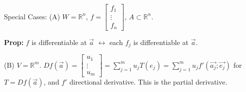\documentclass[10pt,letterpaper]{article}
\newcommand{\n}{\hfill\break}
\newcommand{\prop}[1]{\par\noindent\settowidth{\hangindent}{\textbf{Prop: }}\textbf{Prop: }#1\n}
\newcommand{\reals}{\mathbb{R}}
\newcommand{\R}{\reals}
\begin{document}
\par\noindent Special Cases:\n
(A) $W=\R^{n}$, $f=\left[\begin{array}{c}f_{1}\\ \vdots\\ f_{n}\end{array}\right]$, $A\subset\R^{n}$.\n

\prop{$f$ is differentiable at $\vec{a}$ $\leftrightarrow$ each $f_{j}$ is differentiable at $\vec{a}$.}

\par\noindent (B) $V=\R^{m}$. $\displaystyle{}Df(\vec{a})=\left[\begin{array}{c}u_{1}\\ \vdots\\ u_{m}\end{array}\right]=\sum_{j=1}^{m}u_{j}T(e_{j})=\sum_{j=1}^{m}u_{j}f'(\vec{a_{j}};\vec{e_{j}})$ for $T=Df(\vec{a})$, and $f'$ directional derivative. This is the partial derivative.
\end{document}
